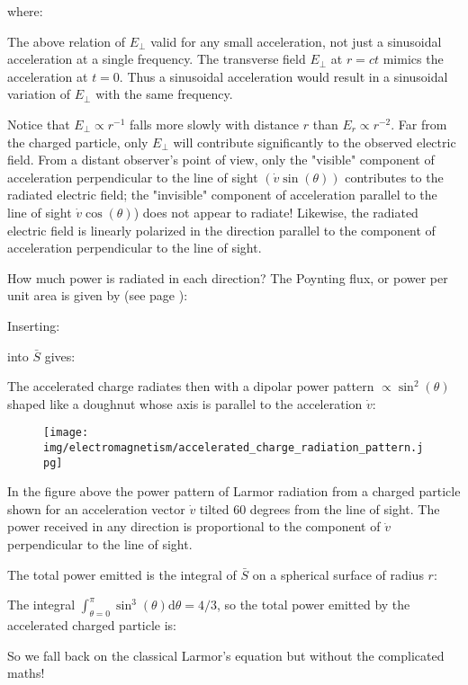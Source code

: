	where:
	
	The above relation of $E_{\perp}$ valid for any small acceleration, not just a sinusoidal acceleration at a single frequency. The transverse field $E_{\perp}$ at $r=c t$ mimics the acceleration at $t=0 .$ Thus a sinusoidal acceleration would result in a sinusoidal variation of $E_{\perp}$ with the same frequency.

	Notice that $E_{\perp} \propto r^{-1}$ falls more slowly with distance $r$ than $E_{r} \propto r^{-2}$. Far from the charged particle, only $E_{\perp}$ will contribute significantly to the observed electric field. From a distant observer's point of view, only the "visible" component of acceleration perpendicular to the line of sight $(\dot{v} \sin(\theta))$ contributes to the radiated electric field; the "invisible" component of acceleration parallel to the line of sight $\dot{v} \cos (\theta)$) does not appear to radiate! Likewise, the radiated electric field is linearly polarized in the direction parallel to the component of acceleration perpendicular to the line of sight.

	How much power is radiated in each direction? The Poynting flux, or power per unit area is given by (see page \pageref{poynting vector}):
	
	Inserting:
	
	into $\bar{S}$ gives:
	
	The accelerated charge radiates then with a dipolar power pattern $\propto \sin ^{2} (\theta)$ shaped like a doughnut whose axis is parallel to the acceleration $\dot{v}$:
	\begin{figure}[H]
		\centering
		\texttt{[image: img/electromagnetism/accelerated\_charge\_radiation\_pattern.jpg]}
	\end{figure}
	In the figure above the power pattern of Larmor radiation from a charged particle shown for an acceleration vector $\dot{v}$ tilted 60 degrees from the line of sight. The power received in any direction is proportional to the component of $\dot{v}$ perpendicular to the line of sight.
	
	The total power emitted is the integral of $\bar{S}$ on a spherical surface of radius $r$:
	
	The integral $\int_{\theta=0}^{\pi} \sin ^{3} (\theta) \mathrm{d} \theta=4 / 3$, so the total power emitted by the accelerated charged particle is:
	
	So we fall back on the classical Larmor's equation but without the complicated maths!
	
